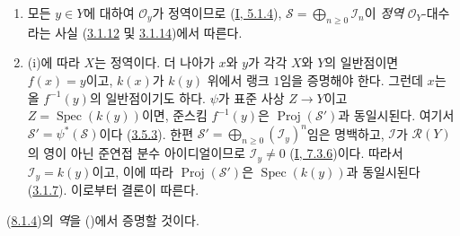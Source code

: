 \begin{enumerate}
\item[\rm(i)] 모든 $y\in Y$에 대하여 $\mathcal{O}_y$가 정역이므로
(\hyperref[I.5.1.4-ko]{I, 5.1.4}),
$\mathcal{S}=\bigoplus_{n\geq0}\mathcal{I}_n$이 \emph{정역}
$\mathcal{O}_Y$-대수라는 사실
(\hyperref[II.3.1.12-ko]{3.1.12} 및
\hyperref[II.3.1.14-ko]{3.1.14})에서 따른다.
\item[\rm(ii)] (i)에 따라 $X$는 정역이다. 더 나아가 $x$와 $y$가
각각 $X$와 $Y$의 일반점이면 $f(x)=y$이고, $k(x)$가 $k(y)$ 위에서
랭크 $1$임을 증명해야 한다. 그런데 $x$는 올 $f^{-1}(y)$의
일반점이기도 하다. $\psi$가 표준 사상 $Z\to Y$이고
$Z=\operatorname{Spec}(k(y))$이면, 준스킴 $f^{-1}(y)$은
$\operatorname{Proj}(\mathcal{S}')$과 동일시된다. 여기서
$\mathcal{S}'=\psi^*(\mathcal{S})$이다
(\hyperref[II.3.5.3-ko]{3.5.3}). 한편
$\mathcal{S}'=\bigoplus_{n\geq0}(\mathcal{I}_y)^n$임은 명백하고,
$\mathcal{I}$가 $\mathcal{R}(Y)$의 영이 아닌 준연접 분수
아이디얼이므로 $\mathcal{I}_y\neq0$
(\hyperref[I.7.3.6-ko]{I, 7.3.6})이다. 따라서
$\mathcal{I}_y=k(y)$이고, 이에 따라
$\operatorname{Proj}(\mathcal{S}')$은
$\operatorname{Spec}(k(y))$과 동일시된다
(\hyperref[II.3.1.7-ko]{3.1.7}). 이로부터 결론이 따른다.
\end{enumerate}

(\hyperref[II.8.1.4-ko]{8.1.4})의 \emph{역}을
()에서 증명할 것이다.

